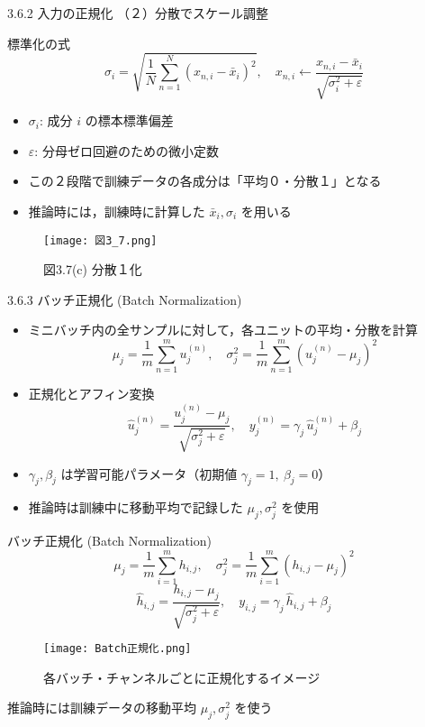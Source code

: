 \documentclass[dvipdfmx,autodetect-engine]{beamer}
\begin{document}
\begin{frame}{3.6.2 入力の正規化 （２）分散でスケール調整}
  \begin{block}{標準化の式}
    \[
      \sigma_i 
      = \sqrt{\frac{1}{N}\sum_{n=1}^N (x_{n,i}-\bar{x}_i)^2}
      ,\quad
      x_{n,i} \leftarrow \frac{x_{n,i}-\bar{x}_i}{\sqrt{\sigma_i^2 + \varepsilon}}
    \]
    \begin{itemize}
      \item $\sigma_i$: 成分 $i$ の標本標準偏差
      \item $\varepsilon$: 分母ゼロ回避のための微小定数
    \end{itemize}
  \end{block}
  \begin{itemize}
    \item この２段階で訓練データの各成分は「平均０・分散１」となる
    \item 推論時には，訓練時に計算した $\bar{x}_i,\sigma_i$ を用いる
  \end{itemize}
  \begin{figure}
    \centering
    \texttt{[image: 図3\_7.png]}
    \caption*{図3.7(c) 分散１化}
  \end{figure}
\end{frame}

\begin{frame}{3.6.3 バッチ正規化 (Batch Normalization)}
  \begin{itemize}
    \item ミニバッチ内の全サンプルに対して，各ユニットの平均・分散を計算
      \[
        \mu_j = \frac{1}{m}\sum_{n=1}^m u_j^{(n)},\quad
        \sigma_j^2 = \frac{1}{m}\sum_{n=1}^m (u_j^{(n)} - \mu_j)^2
      \]
    \item 正規化とアフィン変換
      \[
        \hat u_j^{(n)}
         = \frac{u_j^{(n)} - \mu_j}{\sqrt{\sigma_j^2 + \varepsilon}},\quad
        y_j^{(n)} = \gamma_j\,\hat u_j^{(n)} + \beta_j
      \tag{3.16}
      \]
    \item $\gamma_j, \beta_j$ は学習可能パラメータ（初期値 $\gamma_j=1,\ \beta_j=0$）
    \item 推論時は訓練中に移動平均で記録した $\mu_j,\sigma_j^2$ を使用
  \end{itemize}
\end{frame}

\begin{frame}{バッチ正規化 (Batch Normalization)}
  \[
    \mu_j = \frac1m\sum_{i=1}^m h_{i,j}, \quad
    \sigma_j^2 = \frac1m\sum_{i=1}^m (h_{i,j}-\mu_j)^2
  \]
  \[
    \hat h_{i,j}
      = \frac{h_{i,j}-\mu_j}{\sqrt{\sigma_j^2+\varepsilon}}, \quad
    y_{i,j}
      = \gamma_j\,\hat h_{i,j} + \beta_j
  \]
  \vspace{0.8em}
  \begin{figure}
    \centering
    \texttt{[image: Batch正規化.png]}
    \caption*{各バッチ・チャンネルごとに正規化するイメージ}
  \end{figure}
  \vspace{-0.5em}
  推論時には訓練データの移動平均 $\mu_j,\sigma_j^2$ を使う  
\end{frame}
\end{document}
